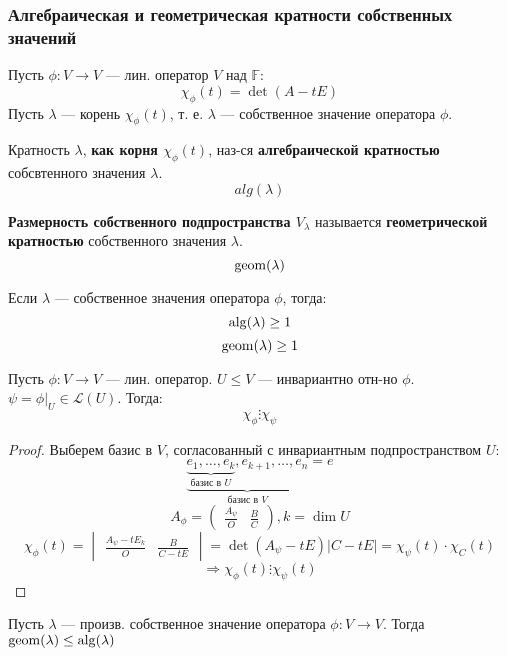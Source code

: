 \subsubsection{Алгебраическая и геометрическая кратности собственных значений}
Пусть $\phi \colon V \rightarrow V$ --- лин. оператор $V$ над $\mathbb{F}$:
\[
\chi_\phi(t) = \det(A - tE)
\]
Пусть $\lambda$ --- корень $\chi_\phi(t)$, т. е. $\lambda$ --- собственное значение оператора $\phi$.
\begin{definition}
Кратность $\lambda$, \textbf{как корня $\chi_\phi(t)$}, наз-ся \textbf{алгебраической кратностью} собсвтенного значения $\lambda$.
  \[
  alg(\lambda)
  \]
\end{definition}
\begin{definition}
  \textbf{Размерность собственного подпространства $V_\lambda$} называется \textbf{геометрической кратностью} собственного значения $\lambda$.
  \[
    \operatorname{geom}(\lambda)
  \]
\end{definition}
\begin{note}
Если $\lambda$ --- собственное значения оператора $\phi$, тогда:
\[
  \operatorname{alg}(\lambda) \geq 1
\]
\[
  \operatorname{geom}(\lambda) \geq 1
\]
\end{note}
\begin{statement}
\label{statement:04_2}
Пусть $\phi \colon V \rightarrow V$ --- лин. оператор. $U \leq V$ --- инвариантно отн-но $\phi$. $\psi = \phi|_{U} \in \mathcal{L}(U)$. Тогда:
\[
  \chi_\phi \vdots \chi_\psi
\]
\end{statement}
\begin{proof}
  Выберем базис в $V$, согласованный с инвариантным подпространством $U$:
  \[
    \underbrace{\underbrace{e_1, \ldots, e_k}_{\text{базис в $U$}}, e_{k + 1}, \ldots, e_n}_{\text{базис в $V$}} = e
  \]
  \[
    A_\phi = \begin{pmatrix} \frac{A_{\psi}}{O} & \frac{B}{C} \end{pmatrix}, k = \dim U
  \]
  \[
    \chi_\phi(t) = \begin{vmatrix} \frac{A_\psi - t E_k}{O} & \frac{B}{C - tE} \end{vmatrix} = \det(A_\psi - tE) \left|C - tE\right| = \chi_\psi(t) \cdot \chi_C(t)
  \]
  \[
  \Rightarrow \chi_\phi(t) \vdots \chi_\psi(t)
  \]
\end{proof}
\begin{consequence}
  \label{consequence:04_3}
  Пусть $\lambda$ --- произв. собственное значение оператора $\phi \colon V \rightarrow V$. Тогда $\operatorname{geom}(\lambda) \leq \operatorname{alg}(\lambda)$
\end{consequence}
